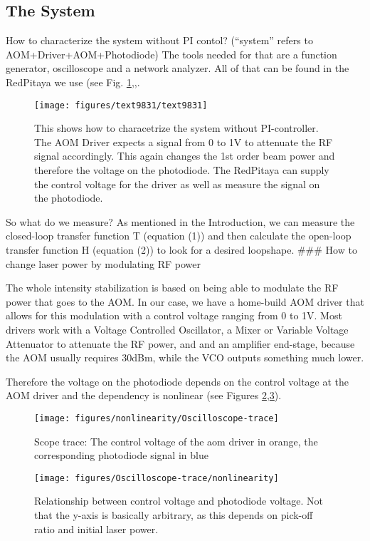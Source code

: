 \documentclass[10pt]{article}
\let\cite\citep
\providecommand\citep{\cite}
\begin{document}
\subsection{The System}\label{the-system}

How to characterize the system without PI contol? (``system'' refers to
AOM+Driver+AOM+Photodiode) The tools needed for that are a function
generator, oscilloscope and a network analyzer. All of that can be found
in the RedPitaya we use (see Fig.
\ref{419186},\cite{pitaya},\cite{pyrpl}.
\begin{figure}[h!]
\begin{center}
\texttt{[image: figures/text9831/text9831]}
\caption{{This shows how to characetrize the system without PI-controller. The AOM
Driver expects a signal from 0 to 1V to attenuate the RF signal
accordingly. This again changes the 1st order beam power and therefore
the voltage on the photodiode. The RedPitaya can supply the control
voltage for the driver as well as measure the signal on the photodiode.
{\label{419186}}%
}}
\end{center}
\end{figure}



So what do we measure? As mentioned in the Introduction, we can measure
the closed-loop transfer function T (equation (1)) and then calculate
the open-loop transfer function H (equation (2)) to look for a desired
loopshape. \#\#\# How to change laser power by modulating RF power

The whole intensity stabilization is based on being able to modulate the
RF power that goes to the AOM. In our case, we have a home-build AOM
driver that allows for this modulation with a control voltage ranging
from 0 to 1V. Most drivers work with a Voltage Controlled Oscillator, a
Mixer or Variable Voltage Attenuator to attenuate the RF power, and and
an amplifier end-stage, because the AOM usually requires 30dBm, while
the VCO outputs something much lower.

Therefore the voltage on the photodiode depends on the control voltage
at the AOM driver and the dependency is nonlinear (see Figures
\ref{646448},\ref{747788}).
\begin{figure}[h!]
\begin{center}
\texttt{[image: figures/nonlinearity/Oscilloscope-trace]}
\caption{{Scope trace: The control voltage of the aom driver in orange, the
corresponding photodiode signal in blue
{\label{646448}}%
}}
\end{center}
\end{figure}
\begin{figure}[h!]
\begin{center}
\texttt{[image: figures/Oscilloscope-trace/nonlinearity]}
\caption{{Relationship between control voltage and photodiode voltage. Not that
the y-axis is basically arbitrary, as this depends on pick-off ratio and
initial laser power.
{\label{747788}}%
}}
\end{center}
\end{figure}
\end{document}
